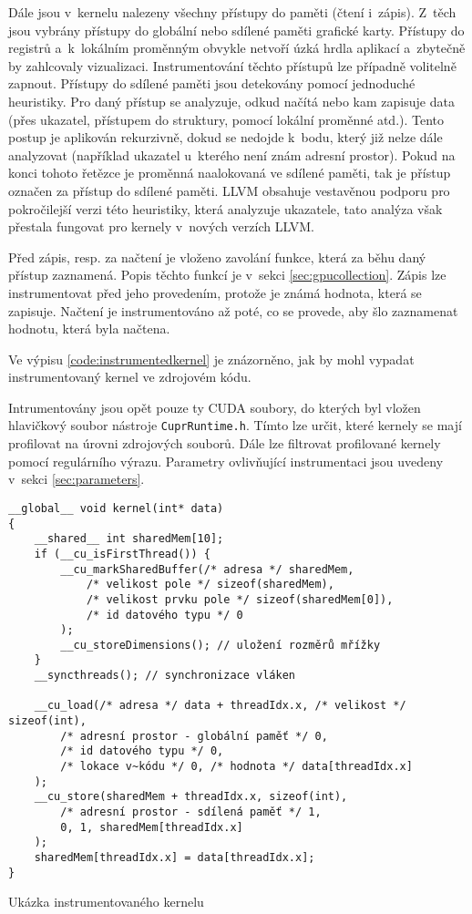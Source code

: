Dále jsou v~kernelu nalezeny všechny přístupy do paměti (čtení i~zápis). Z~těch jsou vybrány přístupy do globální nebo sdílené paměti grafické karty. Přístupy do registrů a~k~lokálním proměnným obvykle netvoří úzká hrdla aplikací a~zbytečně by zahlcovaly vizualizaci. Instrumentování těchto přístupů lze případně volitelně zapnout. Přístupy do sdílené paměti jsou detekovány pomocí jednoduché heuristiky. Pro daný přístup se analyzuje, odkud načítá nebo kam zapisuje data (přes ukazatel, přístupem do struktury, pomocí lokální proměnné atd.). Tento postup je aplikován rekurzivně, dokud se nedojde k~bodu, který již nelze dále analyzovat (například ukazatel u~kterého není znám adresní prostor). Pokud na konci tohoto řetězce je proměnná naalokovaná ve sdílené paměti, tak je přístup označen za přístup do sdílené paměti. LLVM obsahuje vestavěnou podporu pro pokročilejší verzi této heuristiky, která analyzuje ukazatele, tato analýza však přestala fungovat pro kernely v~nových verzích LLVM.

Před zápis, resp. za načtení je vloženo zavolání funkce, která za běhu daný přístup zaznamená. Popis těchto funkcí je v~sekci \ref{sec:gpucollection}. Zápis lze instrumentovat před jeho provedením, protože je známá hodnota, která se zapisuje. Načtení je instrumentováno až poté, co se provede, aby šlo zaznamenat hodnotu, která byla načtena.

Ve výpisu \ref{code:instrumentedkernel} je znázorněno, jak by mohl vypadat instrumentovaný kernel ve zdrojovém kódu.
    
Intrumentovány jsou opět pouze ty CUDA soubory, do kterých byl vložen hlavičkový soubor nástroje \texttt{CuprRuntime.h}. Tímto lze určit, které kernely se mají profilovat na úrovni zdrojových souborů. Dále lze filtrovat profilované kernely pomocí regulárního výrazu. Parametry ovlivňující instrumentaci jsou uvedeny v~sekci \ref{sec:parameters}.

\begin{listing}
\begin{verbatim}
__global__ void kernel(int* data)
{
    __shared__ int sharedMem[10];
    if (__cu_isFirstThread()) {
        __cu_markSharedBuffer(/* adresa */ sharedMem,
            /* velikost pole */ sizeof(sharedMem),
            /* velikost prvku pole */ sizeof(sharedMem[0]),
            /* id datového typu */ 0
        );
        __cu_storeDimensions(); // uložení rozměrů mřížky
    }
    __syncthreads(); // synchronizace vláken
    
    __cu_load(/* adresa */ data + threadIdx.x, /* velikost */ sizeof(int),
        /* adresní prostor - globální paměť */ 0,
        /* id datového typu */ 0,
        /* lokace v~kódu */ 0, /* hodnota */ data[threadIdx.x]
    );
    __cu_store(sharedMem + threadIdx.x, sizeof(int),
        /* adresní prostor - sdílená paměť */ 1,
        0, 1, sharedMem[threadIdx.x]
    );
    sharedMem[threadIdx.x] = data[threadIdx.x];
}
\end{verbatim}
\caption{Ukázka instrumentovaného kernelu}
\label{code:instrumentedkernel}
\end{listing}

